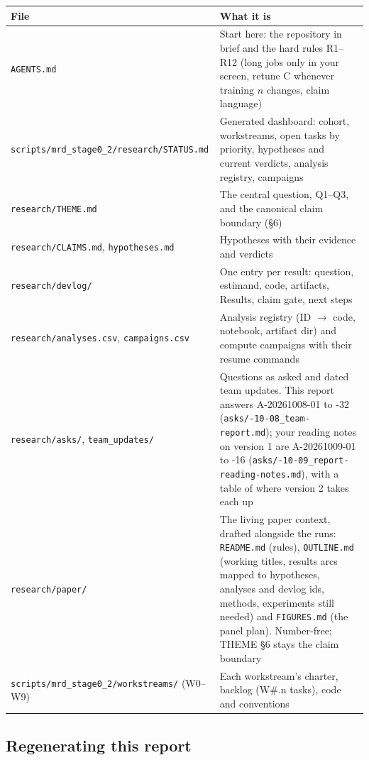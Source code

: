 \begin{tabularx}{\linewidth}{>{\raggedright\arraybackslash}p{5.6cm} >{\raggedright\arraybackslash}X}
\toprule
File & What it is \\
\midrule
\texttt{AGENTS.md} & Start here: the repository in brief and the hard rules R1--R12 (long jobs only in your screen, retune C whenever training $n$ changes, claim language) \\
\nolinkurl{scripts/mrd_stage0_2/research/STATUS.md} & Generated dashboard: cohort, workstreams, open tasks by priority, hypotheses and current verdicts, analysis registry, campaigns \\
\texttt{research/THEME.md} & The central question, Q1--Q3, and the canonical claim boundary (\S6) \\
\texttt{research/CLAIMS.md}, \texttt{hypotheses.md} & Hypotheses with their evidence and verdicts \\
\texttt{research/devlog/} & One entry per result: question, estimand, code, artifacts, Results, claim gate, next steps \\
\texttt{research/analyses.csv}, \texttt{campaigns.csv} & Analysis registry (ID $\to$ code, notebook, artifact dir) and compute campaigns with their resume commands \\
\texttt{research/asks/}, \texttt{team\_updates/} & Questions as asked and dated team updates. This report answers A-20261008-01 to -32 (\texttt{asks/\allowbreak 2026-10-08\_team-report.md}); your reading notes on version 1 are A-20261009-01 to -16 (\texttt{asks/\allowbreak 2026-10-09\_report-reading-notes.md}), with a table of where version 2 takes each up \\
\texttt{research/paper/} & The living paper context, drafted alongside the runs: \texttt{README.md} (rules), \texttt{OUTLINE.md} (working titles, results arcs mapped to hypotheses, analyses and devlog ids, methods, experiments still needed) and \texttt{FIGURES.md} (the panel plan). Number-free; THEME \S6 stays the claim boundary \\
\nolinkurl{scripts/mrd_stage0_2/workstreams/} (W0--W9) & Each workstream's charter, backlog (W\#.n tasks), code and conventions \\
\bottomrule
\end{tabularx}

\subsection*{Regenerating this report}

